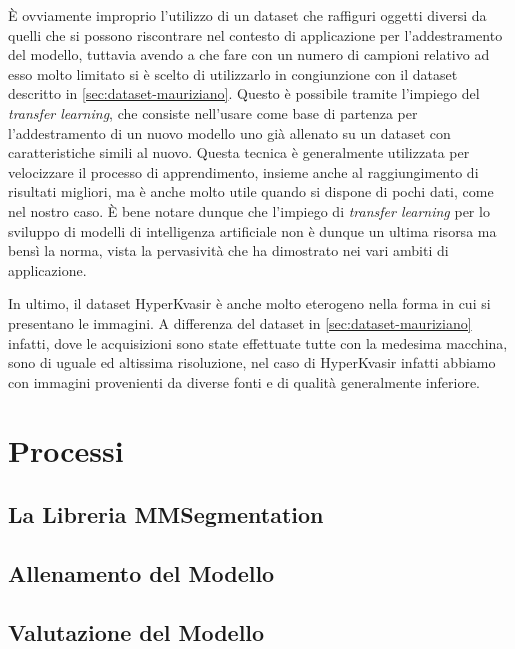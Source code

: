 È ovviamente improprio l'utilizzo di un dataset che raffiguri
oggetti diversi da quelli che si possono riscontrare nel 
contesto di applicazione per l'addestramento del modello,
tuttavia avendo a che fare con un numero di campioni
relativo ad esso molto limitato si è scelto di utilizzarlo
in congiunzione con il dataset descritto in \ref{sec:dataset-mauriziano}.
Questo è possibile tramite l'impiego del {\it transfer learning},
che consiste nell'usare come base di partenza per l'addestramento
di un nuovo modello uno già allenato su un dataset con
caratteristiche simili al nuovo.
Questa tecnica è generalmente utilizzata per velocizzare
il processo di apprendimento, insieme anche al raggiungimento
di risultati migliori, ma è anche molto utile quando si 
dispone di pochi dati, come nel nostro caso.
È bene notare dunque che l'impiego di {\it transfer learning}
per lo sviluppo di modelli di intelligenza artificiale non è
dunque un ultima risorsa ma bensì la norma, vista la
pervasività che ha dimostrato nei vari ambiti di applicazione.

In ultimo, il dataset HyperKvasir è anche molto eterogeno
nella forma in cui si presentano le immagini.
A differenza del dataset in \ref{sec:dataset-mauriziano} infatti,
dove le acquisizioni sono state effettuate tutte con la medesima
macchina, sono di uguale ed altissima risoluzione, nel caso
di HyperKvasir infatti abbiamo con immagini provenienti da diverse
fonti e di qualità generalmente inferiore.


\section{Processi}
\subsection{La Libreria MMSegmentation}
\subsection{Allenamento del Modello}
\subsection{Valutazione del Modello}